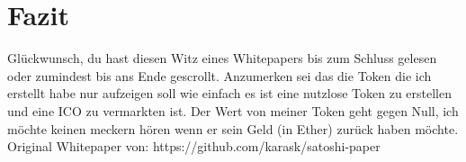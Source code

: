 \documentclass[a4paper, 10pt]{article}
\begin{document}
\section{Fazit}\label{conclusion}

Glückwunsch, du hast diesen Witz eines Whitepapers bis zum Schluss gelesen oder zumindest bis ans Ende gescrollt. Anzumerken sei das die Token die ich erstellt habe nur aufzeigen soll wie einfach es ist eine nutzlose Token zu erstellen und eine ICO zu vermarkten ist. Der Wert von meiner Token geht gegen Null, ich möchte keinen meckern hören wenn er sein Geld (in Ether) zurück haben möchte.
Original Whitepaper von: https://github.com/karask/satoshi-paper

\newpage

\printbibliography
\end{document}
